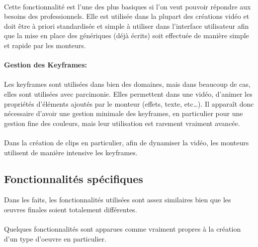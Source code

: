 \paragraph{}

Cette fonctionnalité est l'une des plus basiques si l'on veut pouvoir
répondre aux besoins des professionnels. Elle est utilisée dans la
plupart des créations vidéo et doit être à priori standardisée et
simple à utiliser dans l'interface utilisateur afin que la mise en place
des génériques (déjà écrits) soit effectuée de manière simple et
rapide par les monteurs.

\paragraph{Gestion des Keyframes:}

\paragraph{}

Les keyframes sont utilisées dans bien des domaines, mais dans beaucoup
de cas, elles sont utilisées avec parcimonie. Elles permettent dans une
vidéo, d'animer les propriétés d'éléments ajoutés par le monteur
(effets, texte, etc\ldots). Il apparaît donc nécessaire d'avoir une
gestion minimale des keyframes, en particulier pour une gestion fine
des couleurs, mais leur utilisation est rarement vraiment avancée.

\paragraph{}

Dans la création de clips en particulier, afin de dynamiser la vidéo,
les monteurs utilisent de manière intensive les keyframes.

\subsection{Fonctionnalités spécifiques} %

Dans les faits, les fonctionnalités utilisées sont assez similaires
bien que les œuvres finales soient totalement différentes.

\paragraph{}

Quelques fonctionnalités sont apparues comme vraiment propres à la
création d'un type d'oeuvre en particulier.

